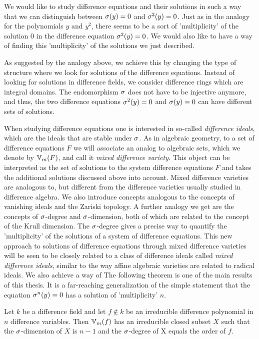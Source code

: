 We would like to study difference equations and their solutions in such a way that we can distinguish between $\sigma(y) = 0$ and $\sigma^2(y) = 0$. Just as in the analogy for the polynomials $y$ and $y^2$,
there seems to be a sort of 'multiplicity' of the solution $0$ in the difference equation $\sigma^2(y) = 0$. We would also like to have a way of finding this 'multiplicity' of the solutions we just described.

As suggested by the analogy above, we achieve this by changing the type of structure where we look for solutions of the difference equations. Instead of looking for solutions in difference fields,
we consider difference rings which are integral domains. The endomorphism $\sigma$ does not have to be injective anymore, and thus, the two difference equations $\sigma^2(y) = 0$ and $\sigma(y) = 0$ can have different sets of solutions.

When studying difference equations one is interested in so-called \emph{difference ideals}, which are the ideals that are stable under $\sigma$. 
As in algebraic geometry, to a set of difference equations $F$ we will associate an analog to algebraic sets, which we denote by $\mathbb{V}_m(F)$, 
and call it \emph{mixed difference variety}. 
This object can be interpreted as the set of solutions to the system difference equations $F$  and takes the additional solutions discussed above into account.
Mixed difference varieties are analogous to, but different from the difference varieties usually studied in difference algebra.
We also introduce concepts analogous to the concepts of vanishing ideals and the Zariski topology.
A further analogy  we get are the concepts of $\sigma$-degree and $\sigma$-dimension, both of which are related to the concept of the Krull dimension.
The $\sigma$-degree gives a precise way to quantify the 'multiplicity' of the solutions of a system of difference equations.
This new approach to solutions of difference equations through mixed difference varieties will be seen to be closely related to a class of difference ideals called \emph{mixed difference ideals},
similar to the way affine algebraic varieties are related to radical ideals.
We also achieve a way of The following theorem is one of the main results of this thesis. It is a far-reaching generalization of the simple statement that the equation $\sigma^n(y) = 0$ has a solution of 'multiplicity' $n$.

\begin{theorem*}[\ref{corfinal}]
Let $k$ be a difference field and let $f \notin k$ be an irreducible difference polynomial in $n$ difference variables. 
Then $\mathbb{V}_m(f)$ has an irreducible closed subset $X$ such that the $\sigma$-dimension of $X$ is $n-1$ and the $\sigma$-degree of X equals the order of $f$.
\end{theorem*}

